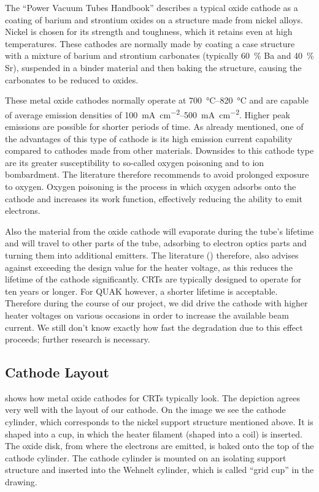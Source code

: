 
The ``Power Vacuum Tubes Handbook'' \cite[chp 3.5.2.1]{Whitaker} describes a typical oxide cathode as a coating of barium and strontium oxides on a structure made from nickel alloys. Nickel is chosen for its strength and toughness, which it retains even at high temperatures. These cathodes are normally made by coating a case structure with a mixture of barium and strontium carbonates (typically \SI{60}{\percent} Ba and \SI{40}{\percent} Sr), suspended in a binder material and then baking the structure, causing the carbonates to be reduced to oxides. 

These metal oxide cathodes normally operate at \SIrange{700}{820}{\celsius} and are capable of average emission densities of \SIrange{100}{500}{\milli\ampere\per\centi\meter\squared}. Higher peak emissions are possible for shorter periods of time. As already mentioned, one of the advantages of this type of cathode is its high emission current capability compared to cathodes made from other materials. Downsides to this cathode type are its greater susceptibility to so-called oxygen poisoning and to ion bombardment. The literature therefore recommends to avoid prolonged exposure to oxygen. Oxygen poisoning is the process in which oxygen adsorbs onto the cathode and increases its work function, effectively reducing the ability to emit electrons. 


Also the material from the oxide cathode will evaporate during the tube's lifetime and will travel to other parts of the tube, adsorbing to electron optics parts and turning them into additional emitters. The literature (\cite[chp 3.5.2.1]{Whitaker}) therefore, also advises against exceeding the design value for the heater voltage, as this reduces the lifetime of the cathode significantly. CRTs are typically designed to operate for ten years or longer. For QUAK however, a shorter lifetime is acceptable. Therefore during the course of our project, we did drive the cathode with higher heater voltages on various occasions in order to increase the available beam current. We still don't know exactly how fast the degradation due to this effect proceeds; further research is necessary.  

\subsection{Cathode Layout}

 shows how metal oxide cathodes for CRTs typically look. The depiction agrees very well with the layout of our cathode. On the image we see the cathode cylinder, which corresponds to the nickel support structure mentioned above. It is shaped into a cup, in which the heater filament (shaped into a coil) is inserted. The oxide disk, from where the electrons are emitted, is baked onto the top of the cathode cylinder. The cathode cylinder is mounted on an isolating support structure and inserted into the Wehnelt cylinder, which is called ``grid cup'' in the drawing. 
  

